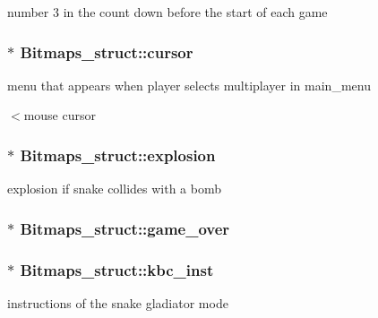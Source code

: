 number 3 in the count down before the start of each game 

\subsubsection[{\texorpdfstring{cursor}{cursor}}]{$\ast$ Bitmaps\+\_\+struct\+::cursor}\hypertarget{group__graphics_gaa9e2b675fd059f98d6fc79bff67f7918}{}\label{group__graphics_gaa9e2b675fd059f98d6fc79bff67f7918}


menu that appears when player selects multiplayer in main\+\_\+menu 

$<$mouse cursor 
\subsubsection[{\texorpdfstring{explosion}{explosion}}]{$\ast$ Bitmaps\+\_\+struct\+::explosion}\hypertarget{group__graphics_gac0df1ce2b02d6d52203766b8cb13c9bf}{}\label{group__graphics_gac0df1ce2b02d6d52203766b8cb13c9bf}


explosion if snake collides with a bomb 

\subsubsection[{\texorpdfstring{game\+\_\+over}{game_over}}]{$\ast$ Bitmaps\+\_\+struct\+::game\+\_\+over}\hypertarget{group__graphics_ga0145b28638489d1308f15646be8042eb}{}\label{group__graphics_ga0145b28638489d1308f15646be8042eb}
\subsubsection[{\texorpdfstring{kbc\+\_\+inst}{kbc_inst}}]{$\ast$ Bitmaps\+\_\+struct\+::kbc\+\_\+inst}\hypertarget{group__graphics_ga4096188495e68d783bf3b8ac7871b7fa}{}\label{group__graphics_ga4096188495e68d783bf3b8ac7871b7fa}


instructions of the snake gladiator mode 

